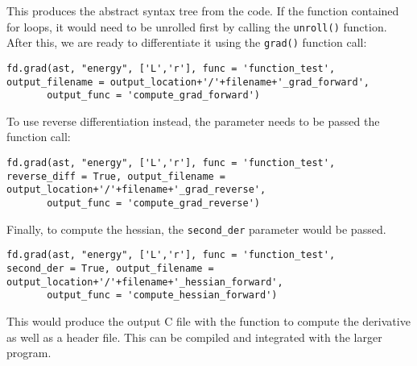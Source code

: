 \documentclass[a4,oneside]{book}
\def\codesize{\small}
\def\code#1{{\codesize\texttt{#1}}}
\begin{document}
This produces the abstract syntax tree from the code. If the function contained for loops, it would need to be unrolled first by calling the \code{unroll()} function. After this, we are ready to differentiate it using the \code{grad()} function call:

\begin{lstlisting}
fd.grad(ast, "energy", ['L','r'], func = 'function_test',
output_filename = output_location+'/'+filename+'_grad_forward',
       output_func = 'compute_grad_forward')
\end{lstlisting}

To use reverse differentiation instead, the parameter needs to be passed the function call:
\begin{lstlisting}
fd.grad(ast, "energy", ['L','r'], func = 'function_test',
reverse_diff = True, output_filename =  output_location+'/'+filename+'_grad_reverse',
       output_func = 'compute_grad_reverse')
\end{lstlisting}

Finally, to compute the hessian, the \code{second\_der} parameter would be passed.
\begin{lstlisting}
fd.grad(ast, "energy", ['L','r'], func = 'function_test',
second_der = True, output_filename = output_location+'/'+filename+'_hessian_forward',
       output_func = 'compute_hessian_forward')
\end{lstlisting}

This would produce the output C file with the function to compute the derivative as well as a header file. This can be compiled and integrated with the larger program.
\end{document}
